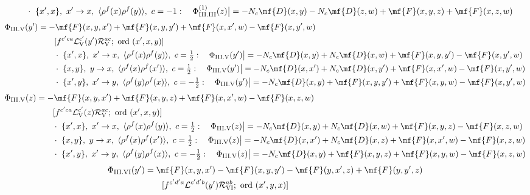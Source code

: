 {\begin{align}
&\qquad\cdot\ \{x',x\},\ x'\to x,\ \langle\rho^{f}(x)\rho^{f}(y)\rangle,\ c=-1:\quad \Phi_{\rm III.III}^{(1)}(z)\big|=-N_{c}\mf{D}(x,y)-N_{c}\mf{D}(z,w)+\mf{F}(x,y,z)+\mf{F}(x,z,w)\notag
\end{align}
\begin{align}
\Phi_{\rm III.V}(y')&=-\mf{F}(x,y,x')+\mf{F}(x,y,y')+\mf{F}(x,x',w)-\mf{F}(x,y',w)\notag\\&\qquad[f^{c'ca}\mathcal{L}_{\rm V}^{c'}(y')\mathcal{R}_{\rm V}^{ac};\ \text{ord}\ (x',x,y)]\notag\\
&\qquad\cdot\ \{x',x\},\ x'\to x,\ \langle\rho^{f}(x)\rho^{f}(y)\rangle,\ c=\tfrac{1}{2}:\quad \Phi_{\rm III.V}(y')\big|=-N_{c}\mf{D}(x,y)+N_{c}\mf{D}(x,w)+\mf{F}(x,y,y')-\mf{F}(x,y',w)\notag\\
&\qquad\cdot\ \{x,y\},\ y\to x,\ \langle\rho^{f}(x)\rho^{f}(x')\rangle,\ c=\tfrac{1}{2}:\quad \Phi_{\rm III.V}(y')\big|=-N_{c}\mf{D}(x,x')+N_{c}\mf{D}(x,y')+\mf{F}(x,x',w)-\mf{F}(x,y',w)\notag\\
&\qquad\cdot\ \{x',y\},\ x'\to y,\ \langle\rho^{f}(y)\rho^{f}(x)\rangle,\ c=-\tfrac{1}{2}:\quad \Phi_{\rm III.V}(y')\big|=-N_{c}\mf{D}(x,y)+\mf{F}(x,y,y')+\mf{F}(x,y,w)-\mf{F}(x,y',w)\notag
\end{align}
\begin{align}
\Phi_{\rm III.V}(z)&=-\mf{F}(x,y,x')+\mf{F}(x,y,z)+\mf{F}(x,x',w)-\mf{F}(x,z,w)\notag\\&\qquad[f^{c'ca}\mathcal{L}_{\rm V}^{c'}(z)\mathcal{R}_{\rm V}^{ac};\ \text{ord}\ (x',x,y)]\notag\\
&\qquad\cdot\ \{x',x\},\ x'\to x,\ \langle\rho^{f}(x)\rho^{f}(y)\rangle,\ c=\tfrac{1}{2}:\quad \Phi_{\rm III.V}(z)\big|=-N_{c}\mf{D}(x,y)+N_{c}\mf{D}(x,w)+\mf{F}(x,y,z)-\mf{F}(x,z,w)\notag\\
&\qquad\cdot\ \{x,y\},\ y\to x,\ \langle\rho^{f}(x)\rho^{f}(x')\rangle,\ c=\tfrac{1}{2}:\quad \Phi_{\rm III.V}(z)\big|=-N_{c}\mf{D}(x,x')+N_{c}\mf{D}(x,z)+\mf{F}(x,x',w)-\mf{F}(x,z,w)\notag\\
&\qquad\cdot\ \{x',y\},\ x'\to y,\ \langle\rho^{f}(y)\rho^{f}(x)\rangle,\ c=-\tfrac{1}{2}:\quad \Phi_{\rm III.V}(z)\big|=-N_{c}\mf{D}(x,y)+\mf{F}(x,y,z)+\mf{F}(x,y,w)-\mf{F}(x,z,w)\notag
\end{align}
\begin{align}
\Phi_{\rm III.VI}(y')&=\mf{F}(x,y,x')-\mf{F}(x,y,y')-\mf{F}(y,x',z)+\mf{F}(y,y',z)\notag\\&\qquad[f^{c'd'a}\mathcal{L}^{c'd'b}(y')\mathcal{R}_{\rm VI}^{ab};\ \text{ord}\ (x',y,x)]\notag\\

\end{align}}
